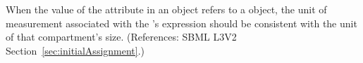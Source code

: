 When the value of the attribute  in an \InitialAssignment
object refers to a \Compartment object, the unit of measurement associated
with the \InitialAssignment's  expression should be consistent
with the unit of that compartment's size.  (References: SBML L3V2
Section~\ref{sec:initialAssignment}.)
